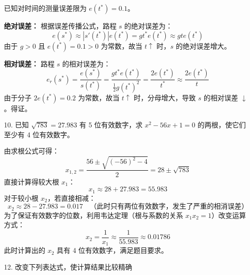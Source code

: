 \documentclass[11pt, a4paper]{ctexart} %
\begin{document}
\begin{myproof}
    已知对时间的测量误差限为 $e(t^*) = 0.1$。
    
    \textbf{绝对误差：} 根据误差传播公式，路程 $s$ 的绝对误差为：
    \[
        e(s^*) \approx |s'(t^*)| e(t^*) = gt^* e(t^*) \approx gt e(t^*)
    \]
    由于 $g > 0$ 且 $e(t^*) = 0.1 > 0$ 为常数，故当 $t \uparrow$ 时，$s$ 的绝对误差增大。
    
    \textbf{相对误差：} 路程 $s$ 的相对误差为：
    \[
        e_r(s^*) = \frac{e(s^*)}{s(t^*)} = \frac{gt^* e(t^*)}{\frac{1}{2}g(t^*)^2} = \frac{2e(t^*)}{t^*} \approx \frac{2e(t^*)}{t}
    \]
    由于分子 $2e(t^*) = 0.2$ 为常数，故当 $t \uparrow$ 时，分母增大，导致 $s$ 的相对误差 $\downarrow$。得证。
\end{myproof}

\begin{problem}{10. 已知 $\sqrt{783} = 27.983$ 有 5 位有效数字，求 $x^2 - 56x + 1 = 0$ 的两根，使它们至少有 4 位有效数字。}
\end{problem}

\begin{solution}
    由求根公式可得：
    \[
        x_{1,2} = \frac{56 \pm \sqrt{(-56)^2 - 4}}{2} = 28 \pm \sqrt{783}
    \]
    直接计算得较大根 $x_1$：
    \[
        x_1 \approx 28 + 27.983 = 55.983
    \]
    对于较小根 $x_2$，若直接相减：
    \[
        x_2 \approx 28 - 27.983 = 0.017 \quad \text{（此时只有两位有效数字，发生了严重的相消误差）}
    \]
    为了保证有效数字的位数，利用韦达定理（根与系数的关系 $x_1 x_2 = 1$）改变运算方式：
    \[
        x_2 = \frac{1}{x_1} \approx \frac{1}{55.983} \approx 0.01786
    \]
    此时计算出的 $x_2$ 具有 4 位有效数字，满足题目要求。
\end{solution}


\begin{problem}{12. 改变下列表达式，使计算结果比较精确}
\end{problem}
\end{document}
